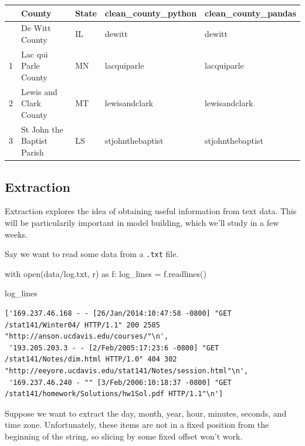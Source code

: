 \documentclass[
  letterpaper,
  DIV=11,
  numbers=noendperiod]{scrreprt}
\newenvironment{Shaded}{\begin{snugshade}}{\end{snugshade}}
\newcommand{\BuiltInTok}[1]{\textcolor[rgb]{0.00,0.23,0.31}{#1}}
\newcommand{\ControlFlowTok}[1]{\textcolor[rgb]{0.00,0.23,0.31}{#1}}
\newcommand{\ImportTok}[1]{\textcolor[rgb]{0.00,0.46,0.62}{#1}}
\newcommand{\NormalTok}[1]{\textcolor[rgb]{0.00,0.23,0.31}{#1}}
\newcommand{\OperatorTok}[1]{\textcolor[rgb]{0.37,0.37,0.37}{#1}}
\newcommand{\StringTok}[1]{\textcolor[rgb]{0.13,0.47,0.30}{#1}}
\begin{document}
\begin{longtable}[]{@{}lllll@{}}
\toprule\noalign{}
& County & State & clean\_county\_python & clean\_county\_pandas \\
\midrule\noalign{}
\endhead
\bottomrule\noalign{}
\endlastfoot
0 & De Witt County & IL & dewitt & dewitt \\
1 & Lac qui Parle County & MN & lacquiparle & lacquiparle \\
2 & Lewis and Clark County & MT & lewisandclark & lewisandclark \\
3 & St John the Baptist Parish & LS & stjohnthebaptist &
stjohnthebaptist \\
\end{longtable}

\subsection{Extraction}\label{extraction}

Extraction explores the idea of obtaining useful information from text
data. This will be particularily important in model building, which
we'll study in a few weeks.

Say we want to read some data from a \texttt{.txt} file.

\begin{Shaded}
\begin{Highlighting}[]
\ControlFlowTok{with} \BuiltInTok{open}\NormalTok{(}\StringTok{\textquotesingle{}data/log.txt\textquotesingle{}}\NormalTok{, }\StringTok{\textquotesingle{}r\textquotesingle{}}\NormalTok{) }\ImportTok{as}\NormalTok{ f:}
\NormalTok{    log\_lines }\OperatorTok{=}\NormalTok{ f.readlines()}

\NormalTok{log\_lines}
\end{Highlighting}
\end{Shaded}

\begin{verbatim}
['169.237.46.168 - - [26/Jan/2014:10:47:58 -0800] "GET /stat141/Winter04/ HTTP/1.1" 200 2585 "http://anson.ucdavis.edu/courses/"\n',
 '193.205.203.3 - - [2/Feb/2005:17:23:6 -0800] "GET /stat141/Notes/dim.html HTTP/1.0" 404 302 "http://eeyore.ucdavis.edu/stat141/Notes/session.html"\n',
 '169.237.46.240 - "" [3/Feb/2006:10:18:37 -0800] "GET /stat141/homework/Solutions/hw1Sol.pdf HTTP/1.1"\n']
\end{verbatim}

Suppose we want to extract the day, month, year, hour, minutes, seconds,
and time zone. Unfortunately, these items are not in a fixed position
from the beginning of the string, so slicing by some fixed offset won't
work.
\end{document}
